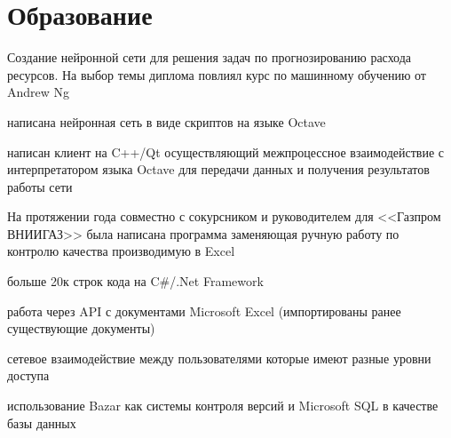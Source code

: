 \documentclass[a4paper]{curricula-vitae}
\begin{document}
\begin{minipage}[t]{0.66\textwidth}
\insertspace

\section{Образование} 

Создание нейронной сети для решения задач по прогнозированию расхода ресурсов. 
На выбор темы диплома повлиял курс по машинному обучению от Andrew Ng
\begin{tightitemize}
\item написана нейронная сеть в виде скриптов на языке Octave
\item написан клиент на C++/Qt осуществляющий межпроцессное взаимодействие с интерпретатором 
языка Octave для передачи данных и получения результатов работы сети
\end{tightitemize}

\insertspace

На протяжении года совместно с сокурсником и руководителем для <<Газпром ВНИИГАЗ>> была написана
программа заменяющая ручную работу по контролю качества производимую в Excel
\begin{tightitemize}
\item больше 20к строк кода на C\#/.Net Framework
\item работа через API с документами Microsoft Excel (импортированы ранее существующие документы)
\item сетевое взаимодействие между пользователями которые имеют разные уровни доступа
\item использование Bazar как системы контроля версий и Microsoft SQL в качестве базы данных
\end{tightitemize}

\insertspace

\end{minipage}%

\end{document}
